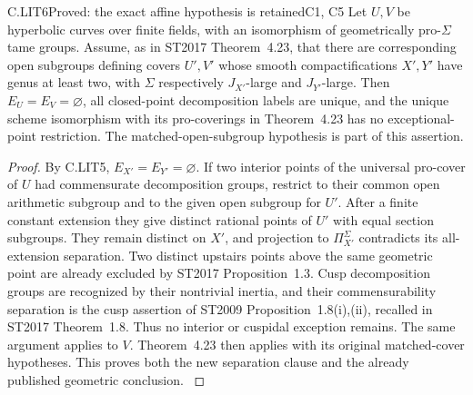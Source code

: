 \begin{claim}{C.LIT6}{Proved: the exact affine hypothesis is retained}{C1, C5}
Let $U,V$ be hyperbolic curves over finite fields, with an
isomorphism of geometrically pro-$\Sigma$ tame groups. Assume,
as in ST2017 Theorem~4.23, that there are corresponding open
subgroups defining covers $U',V'$ whose smooth compactifications
$X',Y'$ have genus at least two, with $\Sigma$ respectively
$J_{X'}$-large and $J_{Y'}$-large. Then $E_U=E_V=\varnothing$,
all closed-point decomposition labels are unique, and the unique
scheme isomorphism with its pro-coverings in Theorem~4.23 has
no exceptional-point restriction. The matched-open-subgroup
hypothesis is part of this assertion.
\end{claim}
\begin{proof}
By C.LIT5, $E_{X'}=E_{Y'}=\varnothing$. If two interior points
of the universal pro-cover of $U$ had commensurate decomposition
groups, restrict to their common open arithmetic subgroup and to
the given open subgroup for $U'$. After a finite constant
extension they give distinct rational points of $U'$ with equal
section subgroups. They remain distinct on $X'$, and projection
to $\Pi_{X'}^\Sigma$ contradicts its all-extension separation.
Two distinct upstairs points above the same geometric point are
already excluded by ST2017 Proposition~1.3. Cusp decomposition
groups are recognized by their nontrivial inertia, and their
commensurability separation is the cusp assertion of ST2009
Proposition~1.8(i),(ii), recalled in ST2017 Theorem~1.8. Thus
no interior or cuspidal exception remains. The same argument
applies to $V$. Theorem~4.23 then applies with its original
matched-cover hypotheses. This proves both the new separation
clause and the already published geometric conclusion.
\citep[Proposition~1.3, Theorems~1.8 and 4.23]{LA_ST2017}
\end{proof}


